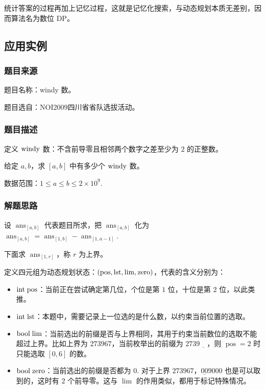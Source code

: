 统计答案的过程再加上记忆过程，这就是记忆化搜索，与动态规划本质无差别，因而算法名为数位
DP。

\subsection{应用实例}

\subsubsection{题目来源}

题目名称：windy 数。

题目选自：NOI2009四川省省队选拔活动。

\subsubsection{题目描述}

定义 \(\rm{windy}\) 数：不含前导零且相邻两个数字之差至少为 \(2\)
的正整数。

给定 \(a,b\)，求 \([a,b]\) 中有多少个 \(\rm{windy}\) 数。

数据范围：\(1\leq a\leq b\leq 2\times 10^9\).

\subsubsection{解题思路}

设 \(\operatorname{ans}_{[a,b]}\) 代表题目所求，把
\(\operatorname{ans}_{[a,b]}\) 化为
\(\operatorname{ans}_{[a,b]}=\operatorname{ans}_{[1,b]}-\operatorname{ans}_{[1,a-1]}\).

下面求 \(\operatorname{ans}_{[1,r]}\)，称 \(r\) 为上界。

定义四元组为动态规划状态：\(\rm{(pos,lst,lim,zero)}\)，代表的含义分别为：

\begin{itemize}
\tightlist
\item
  \(\rm{int\;pos}\)：当前正在尝试确定第几位，个位是第 \(1\) 位，十位是第
  \(2\) 位，以此类推。
\item
  \(\rm{int \;lst}\)：本题中，需要记录上一位选的是什么数，以约束当前位置的选取。
\item
  \(\rm{bool\;lim}\)：当前选出的前缀是否与上界相同，其用于约束当前数位的选取不能超过上界。比如上界为
  \(273967\)，当前枚举出的前缀为 \(2739\underline{\quad}\)，则
  \(\operatorname{pos}=2\) 时只能选取 \([0,6]\) 的数。
\item
  \(\rm{bool\;zero}\)：当前选出的前缀是否都为 \(0\). 对于上界
  \(273967\)，\(\underline{00}9000\) 也是可以取到的，这时有 \(2\)
  个前导零。这与 \(\operatorname{lim}\) 的作用类似，都用于标记特殊情况。
\end{itemize}

